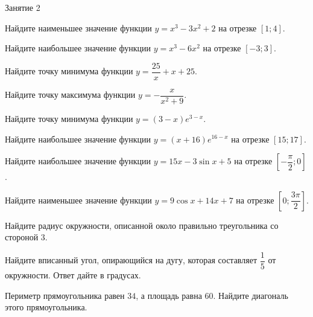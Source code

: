 \begin{class}[number=2]
	\begin{listofex}
		\item Занятие 2
	\end{listofex}
\end{class}

\begin{homework}[number=1]
	\begin{listofex}
		\item Найдите наименьшее значение функции \(y=x^3-3x^2+2\) на отрезке \([1;4]\).
		\item Найдите наибольшее значение функции \(y=x^3-6x^2\) на отрезке \([-3;3]\).
		\item Найдите точку минимума функции \(y=\dfrac{ 25 }{ x }+x+25\).
		\item Найдите точку максимума функции \(y=-\dfrac{ x }{ x^2+9 }\).
		\item Найдите точку минимума функции \(y=(3-x)e^{3-x}\).
		\item Найдите наибольшее значение функции \(y=(x+16)e^{16-x}\) на отрезке \([15;17]\).
		\item Найдите наибольшее значение функции \( y=15x-3\sin x +5 \) на отрезке \( \left[ -\dfrac{ \pi }{ 2 }; 0 \right] \).
		\item Найдите наименьшее значение функции \( y=9 \cos x +14x + 7 \) на отрезке \( \left[ 0; \dfrac{ 3\pi }{ 2 } \right] \).
		\item Найдите радиус окружности, описанной около правильно треугольника со стороной \(3\).
		\item Найдите вписанный угол, опирающийся на дугу, которая составляет \(\dfrac{ 1 }{ 5 }\) от окружности. Ответ дайте в градусах.
		\item Периметр прямоугольника равен \(34\), а площадь равна \(60\). Найдите диагональ этого прямоугольника.
	\end{listofex}
\end{homework}

